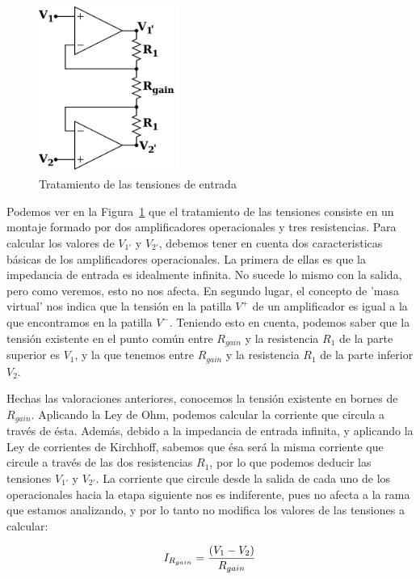 \documentclass[a4paper,titlepage]{article}
\begin{document}
\begin{figure}[!h]
 \begin{center}
  \includegraphics[width=130pt]{./parte1.png}
  \caption{Tratamiento de las tensiones de entrada}
  \label{Parte1}
 \end{center}
\end{figure}

Podemos ver en la Figura~\ref{Parte1} que el tratamiento de las tensiones consiste en un montaje formado por dos amplificadores operacionales y tres resistencias. Para calcular los valores de $V_{1'}$ y $V_{2'}$, debemos
tener en cuenta dos caracteristicas básicas de los amplificadores operacionales. La primera de ellas es que la impedancia de entrada es idealmente infinita. No sucede lo mismo con la salida, pero como veremos, esto
no nos afecta. En segundo lugar, el concepto de 'masa virtual' nos indica que la tensión en la patilla $V^{+}$ de un amplificador es igual a la que encontramos en la patilla $V^{-}$. Teniendo esto en cuenta, podemos
saber que la tensión existente en el punto común entre $R_{gain}$ y la resistencia $R_{1}$ de la parte superior es $V_{1}$, y la que tenemos entre $R_{gain}$ y la resistencia $R_{1}$ de la parte inferior $V_{2}$.

Hechas las valoraciones anteriores, conocemos la tensión existente en bornes de $R_{gain}$. Aplicando la Ley de Ohm, podemos calcular la corriente que circula a través de ésta. Además, debido a la impedancia
de entrada infinita, y aplicando la Ley de corrientes de Kirchhoff, sabemos que ésa será la misma corriente que circule a través de las dos resistencias $R_{1}$, por lo que podemos deducir las tensiones $V_{1'}$ y $V_{2'}$.
La corriente que circule desde la salida de cada uno de los operacionales hacia la etapa siguiente nos es indiferente, pues no afecta a la rama que estamos analizando, y por lo tanto no modifica los valores de las
tensiones a calcular:

\begin{equation}
I_{R_{gain}} = {{(V_{1} - V_{2})} \over {R_{gain}}}
\label{Rgain}
\end{equation}
\end{document}
